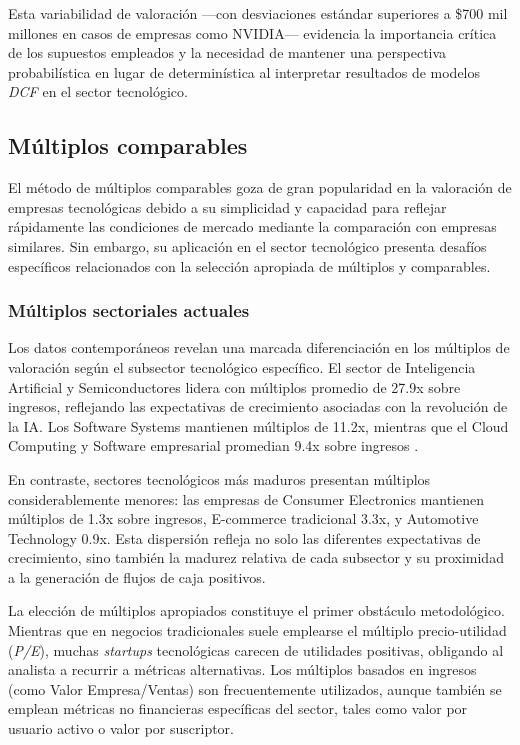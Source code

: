Esta variabilidad de valoración ---con desviaciones estándar superiores a \$700 mil millones en casos de empresas como NVIDIA--- evidencia la importancia crítica de los supuestos empleados y la necesidad de mantener una perspectiva probabilística en lugar de determinística al interpretar resultados de modelos \emph{DCF} en el sector tecnológico.

\subsection{Múltiplos comparables}

El método de múltiplos comparables goza de gran popularidad en la valoración de empresas tecnológicas debido a su simplicidad y capacidad para reflejar rápidamente las condiciones de mercado mediante la comparación con empresas similares. Sin embargo, su aplicación en el sector tecnológico presenta desafíos específicos relacionados con la selección apropiada de múltiplos y comparables.

\subsubsection{Múltiplos sectoriales actuales}

Los datos contemporáneos revelan una marcada diferenciación en los múltiplos de valoración según el subsector tecnológico específico. El sector de Inteligencia Artificial y Semiconductores lidera con múltiplos promedio de 27.9x sobre ingresos, reflejando las expectativas de crecimiento asociadas con la revolución de la IA. Los Software Systems mantienen múltiplos de 11.2x, mientras que el Cloud Computing y Software empresarial promedian 9.4x sobre ingresos \citep{multiples2024}.

En contraste, sectores tecnológicos más maduros presentan múltiplos considerablemente menores: las empresas de Consumer Electronics mantienen múltiplos de 1.3x sobre ingresos, E-commerce tradicional 3.3x, y Automotive Technology 0.9x. Esta dispersión refleja no solo las diferentes expectativas de crecimiento, sino también la madurez relativa de cada subsector y su proximidad a la generación de flujos de caja positivos.

La elección de múltiplos apropiados constituye el primer obstáculo metodológico. Mientras que en negocios tradicionales suele emplearse el múltiplo precio-utilidad (\emph{P/E}), muchas \emph{startups} tecnológicas carecen de utilidades positivas, obligando al analista a recurrir a métricas alternativas. Los múltiplos basados en ingresos (como Valor Empresa/Ventas) son frecuentemente utilizados, aunque también se emplean métricas no financieras específicas del sector, tales como valor por usuario activo o valor por suscriptor.

